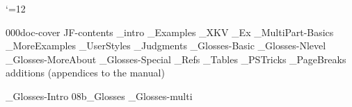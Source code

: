 




 \catcode`\@=12











\get 000doc-cover
\get JF-contents
_intro
_Examples
_XKV
_Ex
_MultiPart-Basics
_MoreExamples
_UserStyles
_Judgments
_Glosses-Basic
_Glosses-Nlevel
_Glosses-MoreAbout
_Glosses-Special
_Refs
_Tables
_PSTricks
_PageBreaks
 \bye
%
 additions (appendices to the manual)
\bye



%
%
%


\bye
_Glosses-Intro
\get 08b_Glosses
_Glosses-multi

